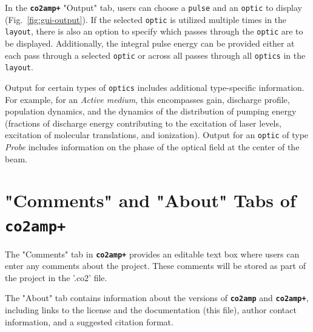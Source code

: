 In the \textbf{\texttt{co2amp+}} "Output" tab, users can choose a \texttt{pulse} and an \texttt{optic} to display (Fig.~\ref{fig:gui-output}). If the selected \texttt{optic} is utilized multiple times in the \texttt{layout}, there is also an option to specify which passes through the \texttt{optic} are to be displayed. Additionally, the integral pulse energy can be provided either at each pass through a selected \texttt{optic} or across all passes through all \texttt{optics} in the \texttt{layout}.

Output for certain types of \texttt{optics} includes additional type-specific information. For example, for an \textit{Active medium}, this encompasses gain, discharge profile, population dynamics, and the dynamics of the distribution of pumping energy (fractions of discharge energy contributing to the excitation of laser levels, excitation of molecular translations, and ionization). Output for an \texttt{optic} of type \textit{Probe} includes information on the phase of the optical field at the center of the beam.


\section{"Comments" and "About" Tabs of \textbf{\texttt{co2amp+}}}
The "Comments" tab in \textbf{\texttt{co2amp+}} provides an editable text box where users can enter any comments about the project. These comments will be stored as part of the project in the '.co2' file.

The "About" tab contains information about the versions of \textbf{\texttt{co2amp}} and \textbf{\texttt{co2amp+}}, including links to the license and the documentation (this file), author contact information, and a suggested citation format.
